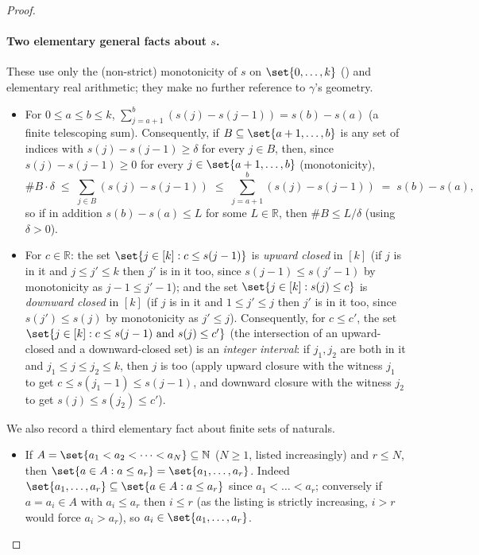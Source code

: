 \begin{proof}
  \paragraph{Two elementary general facts about $s$.} These use only the (non-strict) monotonicity
  of $s$ on $\set{0,\dots,k}$ () and elementary real arithmetic; they
  make no further reference to $\gamma$'s geometry.
  \begin{itemize}
    \item[(F1) \emph{Telescoping and the big-edge count bound.}] For $0\le a\le b\le k$,
    $\sum_{j=a+1}^{b} (s(j)-s(j-1)) = s(b)-s(a)$ (a finite telescoping sum). Consequently, if
    $B \subseteq \set{a+1,\dots,b}$ is any set of indices with $s(j)-s(j-1)\ge\delta$ for every
    $j\in B$, then, since $s(j)-s(j-1)\ge0$ for every $j\in\set{a+1,\dots,b}$ (monotonicity),
    \[
      \#B \cdot \delta \;\le\; \sum_{j\in B}(s(j)-s(j-1)) \;\le\; \sum_{j=a+1}^{b}(s(j)-s(j-1))
      \;=\; s(b)-s(a)
      ,
    \]
    so if in addition $s(b)-s(a) \le L$ for some $L\in\mathbb{R}$, then $\#B \le L/\delta$ (using
    $\delta>0$).
    \item[(F2) \emph{One-sided closure.}] For $c\in\mathbb{R}$: the set
    $\set{j\in[k] : c\le s(j-1)}$ is \emph{upward closed} in $[k]$ (if $j$ is in it and $j\le
    j'\le k$ then $j'$ is in it too, since $s(j-1)\le s(j'-1)$ by monotonicity as $j-1\le j'-1$);
    and the set $\set{j\in[k] : s(j)\le c}$ is \emph{downward closed} in $[k]$ (if $j$ is in it
    and $1\le j'\le j$ then $j'$ is in it too, since $s(j')\le s(j)$ by monotonicity as
    $j'\le j$). Consequently, for $c\le c'$, the set $\set{j\in[k] : c\le s(j-1) \text{ and } s(j)
    \le c'}$ (the intersection of an upward-closed and a downward-closed set) is an
    \emph{integer interval}: if $j_1,j_2$ are both in it and $j_1\le j\le j_2\le k$, then $j$ is
    too (apply upward closure with the witness $j_1$ to get $c\le s(j_1-1)\le s(j-1)$, and downward
    closure with the witness $j_2$ to get $s(j)\le s(j_2)\le c'$).
  \end{itemize}
  We also record a third elementary fact about finite sets of naturals.
  \begin{itemize}
    \item[(F3)] If $A=\set{a_1<a_2<\dots<a_N}\subseteq\mathbb{N}$ ($N\ge1$, listed increasingly)
    and $r\le N$, then $\set{a\in A : a\le a_r} = \set{a_1,\dots,a_r}$. Indeed
    $\set{a_1,\dots,a_r}\subseteq\set{a\in A:a\le a_r}$ since $a_1<\dots<a_r$; conversely if
    $a=a_i\in A$ with $a_i\le a_r$ then $i\le r$ (as the listing is strictly increasing, $i>r$
    would force $a_i>a_r$), so $a_i\in\set{a_1,\dots,a_r}$.
  \end{itemize}


\end{proof}
